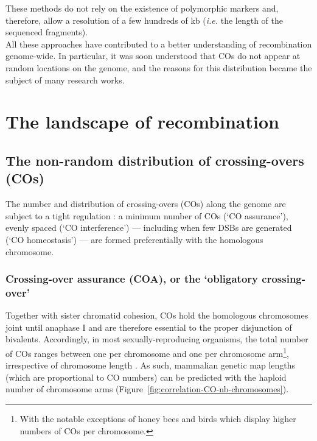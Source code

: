 These methods do not rely on the existence of polymorphic markers and, therefore, allow a resolution of a few hundreds of kb (\textit{i.e.} the length of the sequenced fragments).\\


All these approaches have contributed to a better understanding of recombination genome-wide.
In particular, it was soon understood that COs do not appear at random locations on the genome, and the reasons for this distribution became the subject of many research works.




\section{The landscape of recombination}
\subsection{The non-random distribution of crossing-overs (COs)}

The number and distribution of crossing-overs (COs) along the genome are subject to a tight regulation \citep[reviewed in][]{jones1984control, jones2006meiotic}: a minimum number of COs (‘CO assurance’), evenly spaced (‘CO interference’) — including when few DSBs are generated (‘CO homeostasis’) — are formed preferentially with the homologous chromosome.



\subsubsection{Crossing-over assurance (COA), or the ‘obligatory crossing-over’}
Together with sister chromatid cohesion, COs hold the homologous chromosomes joint until anaphase I \citep[reviewed in][]{roeder1997meiotic} and are therefore essential to the proper disjunction of bivalents.
Accordingly, in most sexually-reproducing organisms, the total number of COs ranges between one per chromosome and one per chromosome arm\footnote{With the notable exceptions of honey bees \citep{beye2006exceptionally} and birds \citep{groenen2009highdensity} which display higher numbers of COs per chromosome.}, irrespective of chromosome length \citep{dutrillaux1986role,pardo-manueldevillena2001recombination,dumas2002chromosomal,hillers2003chromosomewide,hassold2004cytological,dumont2017variation}.
As such, mammalian genetic map lengths (which are proportional to CO numbers) can be predicted with the haploid number of chromosome arms (Figure~\ref{fig:correlation-CO-nb-chromosomes}).

